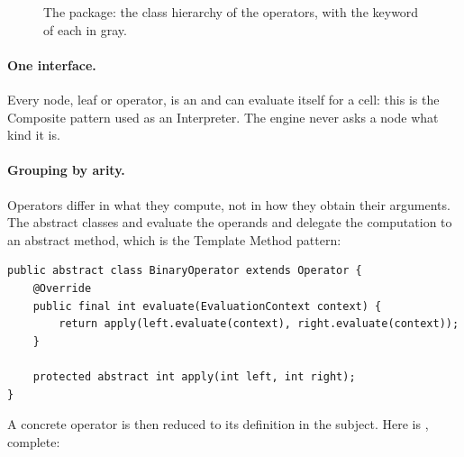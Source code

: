 \begin{figure}[tbp]
    \caption{The  package: the class hierarchy of the operators, with the
        keyword of each in gray.}
    \label{fig:rule}
\end{figure}

\paragraph{One interface.} Every node, leaf or operator, is an  and can
evaluate itself for a cell: this is the Composite pattern used as an Interpreter. The engine
never asks a node what kind it is.

\paragraph{Grouping by arity.} Operators differ in what they compute, not in how they obtain
their arguments. The abstract classes  and  evaluate the
operands and delegate the computation to an abstract method, which is the Template Method
pattern:

\begin{lstlisting}
public abstract class BinaryOperator extends Operator {
    @Override
    public final int evaluate(EvaluationContext context) {
        return apply(left.evaluate(context), right.evaluate(context));
    }

    protected abstract int apply(int left, int right);
}
\end{lstlisting}

A concrete operator is then reduced to its definition in the subject. Here is ,
complete:

